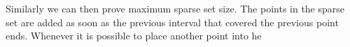 \documentclass[letterpaper,11pt]{article}
\begin{document}
\begin{enumerate}
\begin{enumerate}
        Similarly we can then prove maximum sparse set size. The points in the 
        sparse set are added as soon as the previous interval that covered the 
        previous point ends. Whenever it is possible to place another point 
        into he 
\end{enumerate}
  

\end{enumerate}
\end{document}
